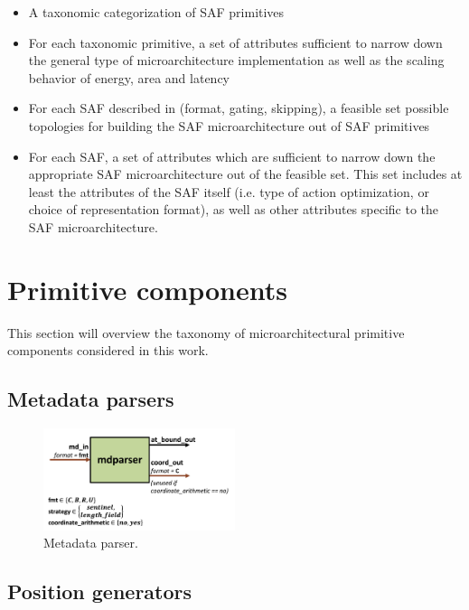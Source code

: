 %
\begin{itemize}
    \item A taxonomic categorization of SAF primitives
    \item For each taxonomic primitive, a set of attributes sufficient to narrow down the general type of microarchitecture implementation as well as the scaling behavior of energy, area and latency
    \item For each SAF described in \cite{sparseloop} (format, gating, skipping), a feasible set possible topologies for building the SAF microarchitecture out of SAF primitives
    \item For each SAF, a set of attributes which are sufficient to narrow down the appropriate SAF microarchitecture out of the feasible set. This set includes at least the attributes of the SAF itself (i.e. type of action optimization, or choice of representation format), as well as other attributes specific to the SAF microarchitecture.
\end{itemize}

\section{Primitive components}

This section will overview the taxonomy of microarchitectural primitive components considered in this work.

\subsection{Metadata parsers}

\begin{figure}[H]
    \centering
    \includegraphics[width=0.5\textwidth]{figures/mdparser.png}
    \caption{Metadata parser.}
    \label{fig:mdparser}
\end{figure}


\subsection{Position generators}

